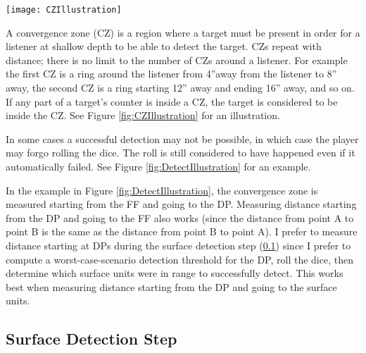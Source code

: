 \documentclass[../TacSubMicroRules.tex]{subfiles}
\begin{document}
\begin{Figure}
    \centering
    \texttt{[image: CZIllustration]}
    \label{fig:CZIllustration}
\end{Figure}

 A convergence zone (CZ) is a region where a target must be present in order for a listener at shallow depth to be able to detect the target.
CZs repeat with distance; there is no limit to the number of CZs around a listener.
For example the first CZ is a ring around the listener from 4''away from the listener to 8'' away, the second CZ is a ring starting 12'' away and ending 16'' away, and so on.
If any part of a target's counter is inside a CZ, the target is considered to be inside the CZ.
See Figure \ref{fig:CZIllustration} for an illustration.

 
In some cases a successful detection may not be possible, in which case the player may forgo rolling the dice.
The roll is still considered to have happened even if it automatically failed.
See Figure \ref{fig:DetectIllustration} for an example.

\begin{design}
    In the example in Figure \ref{fig:DetectIllustration}, the convergence zone is measured starting from the FF and going to the DP.
    Measuring distance starting from the DP and going to the FF also works (since the distance from point A to point B is the same as the distance from point B to point A).
    I prefer to measure distance starting at DPs during the surface detection step (\ref{sub:surface_detection_step}) since I prefer to compute a worst-case-scenario detection threshold for the DP, roll the dice, then determine which surface units were in range to successfully detect.
    This works best when measuring distance starting from the DP and going to the surface units.
\end{design}

\subsection{Surface Detection Step}%
\label{sub:surface_detection_step}
\end{document}
